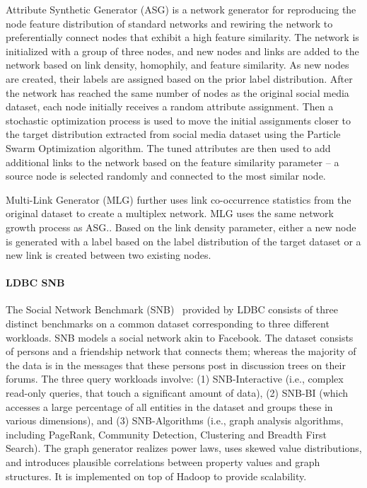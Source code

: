 Attribute Synthetic Generator (ASG) is a network generator for reproducing the node feature distribution of standard networks and rewiring the network to preferentially connect nodes that exhibit a high feature similarity. The network is initialized with a group of three nodes, and new nodes and links are added to the network based on link density, homophily, and feature similarity. As new nodes are created, their labels are assigned based on the prior label distribution. After the network has reached the same number of nodes as the original social media dataset, each node initially receives a random attribute assignment. Then a stochastic optimization
process is used to move the initial assignments closer to the target distribution extracted from social media dataset using the Particle Swarm Optimization algorithm. The tuned attributes are then used to add additional links to the network based on the feature similarity parameter -- a source node is selected randomly and connected to the most similar node.

Multi-Link Generator (MLG) further  uses link co-occurrence statistics from the original dataset to create a multiplex network. MLG uses the same network growth process as ASG.. Based on the link density parameter, either a new node is generated with a label based on the label distribution of the target dataset or a new link is created between two existing nodes.


\paragraph{LDBC SNB} The Social Network Benchmark (SNB)~\cite{Erling:2015:LSN:2723372.2742786} provided by LDBC consists of three distinct benchmarks on a common dataset corresponding to three different workloads. SNB models a social network akin to Facebook. The dataset consists of persons and a friendship network that connects them; whereas the majority of the data is in the messages that these persons post in discussion trees on their forums. The three query workloads involve: (1) SNB-Interactive (i.e., complex read-only queries, that touch a significant amount of data), (2) SNB-BI (which accesses a large percentage of all entities in the dataset and groups these in various dimensions), and (3) SNB-Algorithms (i.e., graph analysis algorithms, including PageRank, Community Detection, Clustering and Breadth First Search). The graph generator realizes power laws, uses skewed value distributions, and introduces plausible correlations between property values and graph structures. It is implemented on top of Hadoop to provide scalability.

